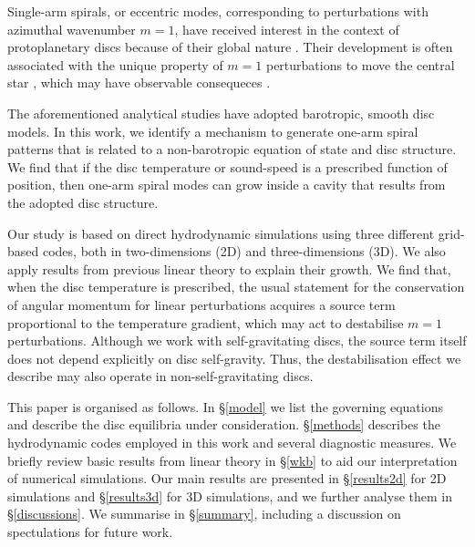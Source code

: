 \documentclass[useAMS,usenatbib]{mn2e}
\begin{document}
Single-arm spirals, or eccentric modes, corresponding to perturbations 
with azimuthal wavenumber $m=1$, have received interest in
the context of protoplanetary discs because of their global nature
\citep{adams89,heemskerk92,laughlin96,tremaine01,papaloizou02,hopkins10}. Their development is 
often associated with the unique property of $m=1$ perturbations to
move the central star \citep{shu90}, which may have observable
consequeces \citep{michael10}. 

The aforementioned analytical studies have adopted barotropic, smooth disc models. 
In this work, we identify a mechanism to generate one-arm
spiral patterns that is related to a non-barotropic equation of
state and disc structure. We find that if the disc temperature or
sound-speed is a prescribed function of position, then 
one-arm spiral modes can grow inside a cavity that results from the
adopted disc structure. 

Our study is based on direct hydrodynamic simulations using three
different grid-based codes, both in two-dimensions (2D) and
three-dimensions (3D). We also apply results from previous linear
theory to explain their growth. We find that, when the disc
temperature is prescribed, the usual statement for the conservation of
angular momentum for linear perturbations acquires a source term
proportional to the temperature gradient, which may act to destabilise
$m=1$ perturbations. Although we work with self-gravitating discs, the
source term itself does not depend explicitly on disc self-gravity. Thus, the
destabilisation effect we describe may also operate in
non-self-gravitating discs. 

This paper is organised as follows. In \S\ref{model} we list the
governing equations and describe the disc equilibria under
consideration. \S\ref{methods} describes the hydrodynamic codes
employed in this work and several diagnostic measures. We briefly
review basic results from linear theory in \S\ref{wkb} to aid our
interpretation of numerical simulations.  Our main results are presented in 
\S\ref{results2d} for 2D simulations and \S\ref{results3d} for 3D
simulations, and we further analyse them in \S\ref{discussions}. 
We summarise in \S\ref{summary}, including a discussion on
spectulations for future work. 











\appendix

\end{document}
